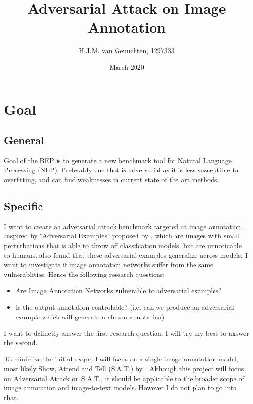 \documentclass[12pt]{extarticle}
\title{Adversarial Attack on Image Annotation}
\author{H.J.M. van Genuchten, 1297333}
\date{March 2020}
\begin{document}
\maketitle

\section{ Goal}
\subsection{General}
Goal of the BEP is to generate a new benchmark tool for Natural Language Processing (NLP). Preferably one that is adversarial as it is less susceptible to overfitting, and can find weaknesses in current state of the art methods.

\subsection{Specific}
I want to create an adversarial attack benchmark targeted at image annotation \cite{xu2016show,venkatesh}. Inspired by "Adversarial Examples" proposed by \citeauthor{szegedy2014intriguing}, which are images with small perturbations that is able to throw off classifcation models, but are unnoticable to humans. \citeauthor{szegedy2014intriguing} also found that these adversarial examples generalize across models. I want to investigate if image annotation networks suffer from the same vulnerablities. Hence the following research questions:
\begin{itemize}
    \item Are Image Annotation Networks vulnerable to adversarial examples?
    \item Is the output annotation controlable? (i.e. can we produce an adversarial example which will generate a chosen annotation)
\end{itemize}

I want to definetly answer the first research question. I will try my best to answer the second.

To minimize the initial scope, I will focus on a single image annotation model, most likely Show, Attend and Tell (S.A.T.) by \citeauthor{xu2016show}. Although this project will focus on Adversarial Attack on S.A.T., it should be applicable to the broader scope of image annotation and image-to-text models. However I do not plan to go into that.
\end{document}
